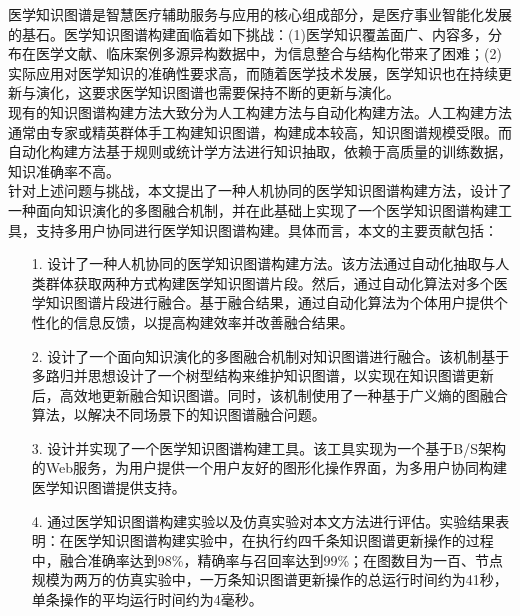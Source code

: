 
\begin{cabstract}
    医学知识图谱是智慧医疗辅助服务与应用的核心组成部分，是医疗事业智能化发展的基石。医学知识图谱构建面临着如下挑战：(1)医学知识覆盖面广、内容多，分布在医学文献、临床案例多源异构数据中，为信息整合与结构化带来了困难；(2)实际应用对医学知识的准确性要求高，而随着医学技术发展，医学知识也在持续更新与演化，这要求医学知识图谱也需要保持不断的更新与演化。\\
    \indent 现有的知识图谱构建方法大致分为人工构建方法与自动化构建方法。人工构建方法通常由专家或精英群体手工构建知识图谱，构建成本较高，知识图谱规模受限。而自动化构建方法基于规则或统计学方法进行知识抽取，依赖于高质量的训练数据，知识准确率不高。\\
    \indent 针对上述问题与挑战，本文提出了一种人机协同的医学知识图谱构建方法，设计了一种面向知识演化的多图融合机制，并在此基础上实现了一个医学知识图谱构建工具，支持多用户协同进行医学知识图谱构建。具体而言，本文的主要贡献包括：
    \begin{itemize}
        \item[1.] 设计了一种人机协同的医学知识图谱构建方法。该方法通过自动化抽取与人类群体获取两种方式构建医学知识图谱片段。然后，通过自动化算法对多个医学知识图谱片段进行融合。基于融合结果，通过自动化算法为个体用户提供个性化的信息反馈，以提高构建效率并改善融合结果。
        \item[2.] 设计了一个面向知识演化的多图融合机制对知识图谱进行融合。该机制基于多路归并思想设计了一个树型结构来维护知识图谱，以实现在知识图谱更新后，高效地更新融合知识图谱。同时，该机制使用了一种基于广义熵的图融合算法，以解决不同场景下的知识图谱融合问题。
        \item[3.] 设计并实现了一个医学知识图谱构建工具。该工具实现为一个基于B/S架构的Web服务，为用户提供一个用户友好的图形化操作界面，为多用户协同构建医学知识图谱提供支持。
        \item[4.] 通过医学知识图谱构建实验以及仿真实验对本文方法进行评估。实验结果表明：在医学知识图谱构建实验中，在执行约四千条知识图谱更新操作的过程中，融合准确率达到98\%，精确率与召回率达到99\%；在图数目为一百、节点规模为两万的仿真实验中，一万条知识图谱更新操作的总运行时间约为41秒，单条操作的平均运行时间约为4毫秒。
    \end{itemize}
\end{cabstract}
    
